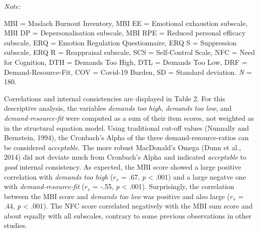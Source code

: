 \documentclass[
  english,
  man,floatsintext]{apa6}
\begin{document}
\begin{table}
{\begin{threeparttable}
\begin{tabular}[t]{lrrrrrrr}
\bottomrule
\end{tabular}
\begin{tablenotes}
\item \textit{Note: } 
\item MBI = Maslach Burnout Inventory, MBI EE = Emotional exhaustion subscale, MBI DP = Depersonalisation subscale, MBI RPE = Reduced personal efficacy subscale, ERQ = Emotion Regulation Questionnaire, ERQ S = Suppression subscale, ERQ R = Reappraisal subscale, SCS = Self-Control Scale, NFC = Need for Cognition, DTH = Demands Too High, DTL = Demands Too Low, DRF = Demand-Resource-Fit, COV = Covid-19 Burden, SD = Standard deviation. \textit{N} = 180.
\end{tablenotes}
\end{threeparttable}}
\end{table}

Correlations and internal consistencies are displayed in Table 2.
For this descriptive analysis, the variables \emph{demands too high}, \emph{demands too low}, and \emph{demand-resource-fit} were computed as a sum of their item scores, not weighted as in the structural equation model.
Using traditional cut-off values (Nunnally and Bernstein, 1994), the Cronbach's Alpha of the three demand-resource-ratios can be considered \emph{acceptable}.
The more robust MacDonald's Omega (Dunn et al., 2014) did not deviate much from Cronbach's Alpha and indicated \emph{acceptable} to \emph{good} internal consistency.
As expected, the MBI score showed a large positive correlation with \emph{demands too high} (\(r_s\) = .67, \emph{p} \textless{} .001) and a large negatve one with \emph{demand-resource-fit} (\(r_s\) = -.55, \emph{p} \textless{} .001).
Surprisingly, the correlation between the MBI score and \emph{demands too low} was positive and also large (\(r_s\) = .44, \emph{p} \textless{} .001).
The NFC score correlated negatively with the MBI sum score and about equally with all subscales, contrary to some previous observations in other studies.
\end{document}
